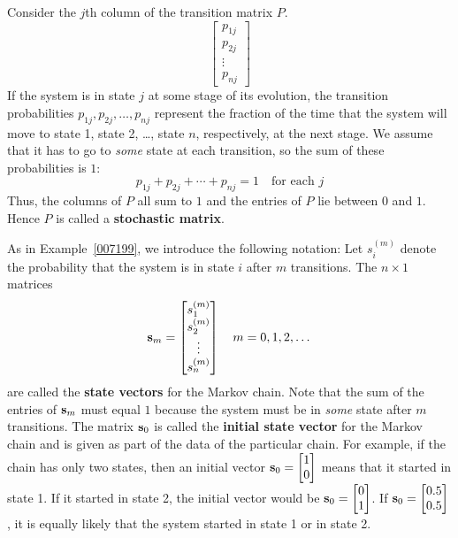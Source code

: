 \documentclass{ximera}
\begin{document}
Consider the $j$th column of the transition matrix $P$.
\begin{equation*}
\begin{bmatrix}
p_{1j} \\
p_{2j} \\
\vdots \\
p_{nj}
\end{bmatrix}
\end{equation*}
If the system is in state $j$ at some stage of its evolution, the transition probabilities $p_{1j}, p_{2j}, \dots, p_{nj}$ represent the fraction of the time that the system will move to state 1, state 2, \dots, state $n$, respectively, at the next stage. We assume that it has to go to \textit{some} state at each transition, so the sum of these probabilities is $1$:
\begin{equation*}
p_{1j} + p_{2j} + \cdots + p_{nj} = 1 \quad \mbox{for each } j
\end{equation*}
Thus, the columns of $P$ all sum to $1$ and the entries of $P$ lie between $0$ and $1$. Hence $P$ is called a \textbf{stochastic matrix}.


As in Example~\ref{007199}, we introduce the following notation: Let $s_{i}^{(m)}$ denote the probability that the system is in state $i$ after $m$ transitions. The $n \times 1$ matrices
\begin{equation*}
{\bf s}_m = \begin{bmatrix}
s_{1}^{(m)} \\
s_{2}^{(m)} \\
\vdots \\
s_{n}^{(m)}
\end{bmatrix}
\quad m = 0, 1, 2, \dots
\end{equation*}
are called the \textbf{state vectors} for the Markov chain. Note that the sum of the entries of ${\bf s}_{m}$ must equal $1$ because the system must be in \textit{some} state after $m$ transitions. The matrix ${\bf s}_{0}$ is called the \textbf{initial state vector} for the Markov chain and is given as part of the data of the particular chain. For example, if the chain has only two states, then an initial vector ${\bf s}_0 = \begin{bmatrix}
1 \\
0
\end{bmatrix}$
 means that it started in state 1. If it started in state 2, the initial vector would be ${\bf s}_0 = \begin{bmatrix}
0 \\
1
\end{bmatrix}$.
 If ${\bf s}_0 = \begin{bmatrix}
0.5 \\
0.5
\end{bmatrix}$, it is equally likely that the system started in state 1 or in state 2.
\end{document}
